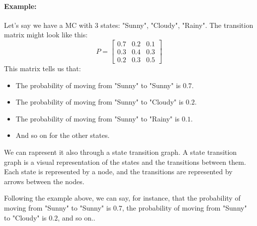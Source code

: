 \documentclass[a4paper]{article}
\begin{document}
\paragraph{Example:} Let's say we have a MC with 3 states: "Sunny", "Cloudy", "Rainy". The transition matrix might look like this:
$$P = \begin{bmatrix} 0.7 & 0.2 & 0.1 \\ 0.3 & 0.4 & 0.3 \\ 0.2 & 0.3 & 0.5 \end{bmatrix}$$
This matrix tells us that: \begin{itemize}
    \item The probability of moving from "Sunny" to "Sunny" is $0.7$.
    \item The probability of moving from "Sunny" to "Cloudy" is $0.2$.
    \item The probability of moving from "Sunny" to "Rainy" is $0.1$.
    \item And so on for the other states.
\end{itemize}

We can rapresent it also through a state transition graph. A state transition graph is a visual representation of the states and the transitions between them. Each state is represented by a node, and the transitions are represented by arrows between the nodes. 
\begin{center}
    \end{center}

Following the example above, we can say, for instance, that the probability of moving from "Sunny" to "Sunny" is $0.7$, the probability of moving from "Sunny" to "Cloudy" is $0.2$, and so on..
\end{document}
